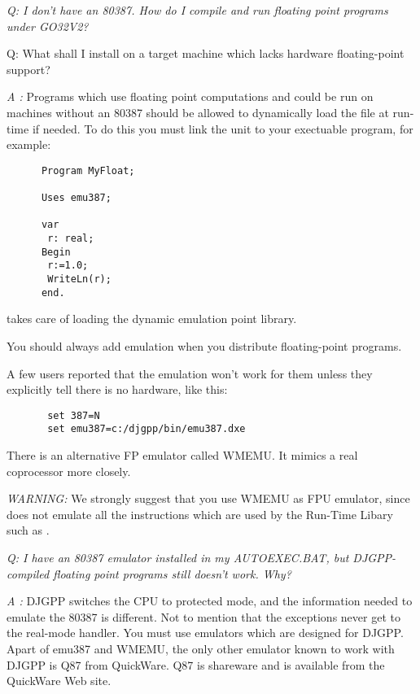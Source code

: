 \documentclass{book}
\begin{document}
{\em Q: I don't have an 80387. How do I compile and run floating point
   programs under GO32V2?

     Q: What shall I install on a target machine which lacks hardware
   floating-point support?
}

{\em A :}
 Programs which use floating point computations and could be run on
   machines without an 80387 should be allowed to dynamically load the
   file at run-time if needed. To do this you must link the  unit to your
   exectuable program, for example:

\begin{verbatim}
      Program MyFloat;

      Uses emu387;

      var
       r: real;
      Begin
       r:=1.0;
       WriteLn(r);
      end.
\end{verbatim}

    takes care of loading the dynamic emulation point library.

   You should always add emulation when you distribute floating-point
   programs.

   A few users reported that the emulation won't work for them unless
   they explicitly tell  there is no  hardware, like this:

\begin{verbatim}
       set 387=N
       set emu387=c:/djgpp/bin/emu387.dxe
\end{verbatim}

   There is an alternative FP emulator called WMEMU. It mimics a real
   coprocessor more closely.

   {\em WARNING:} We strongly suggest that you use WMEMU as FPU emulator, since
    does not emulate all the instructions which are used by the
   Run-Time Libary such as .


{\em   Q: I have an 80387 emulator installed in my AUTOEXEC.BAT, but
   DJGPP-compiled floating point programs still doesn't work. Why?
}


{\em   A :} DJGPP switches the CPU to protected mode, and the information
   needed to emulate the 80387 is different. Not to mention that the
   exceptions never get to the real-mode handler. You must use emulators
   which are designed for DJGPP. Apart of emu387 and WMEMU, the only
   other emulator known to work with DJGPP is Q87 from QuickWare. Q87 is
   shareware and is available from the QuickWare Web site.
\end{document}
